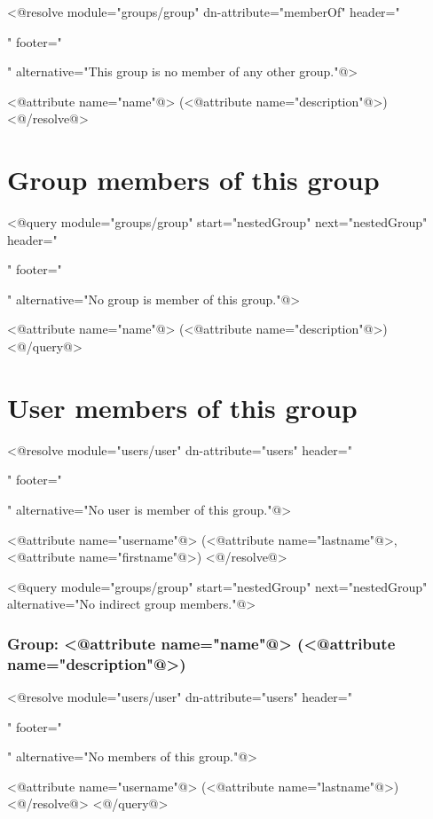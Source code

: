 <@resolve module="groups/group" dn-attribute="memberOf" header="\begin{itemize}" footer="\end{itemize}" alternative="This group is no member of any other group."@>
\item <@attribute name="name"@> (<@attribute name="description"@>)
<@/resolve@>


\section*{Group members of this group}

<@query module="groups/group" start="nestedGroup" next="nestedGroup" header="\begin{itemize}" footer="\end{itemize}" alternative="No group is member of this group."@>
  \item <@attribute name="name"@> (<@attribute name="description"@>)
<@/query@>

\section*{User members of this group}

<@resolve module="users/user" dn-attribute="users" header="\begin{itemize}" footer="\end{itemize}" alternative="No user is member of this group."@>
  \item <@attribute name="username"@> (<@attribute name="lastname"@>, <@attribute name="firstname"@>)
<@/resolve@>

<@query module="groups/group" start="nestedGroup" next="nestedGroup" alternative="No indirect group members."@>
  \subsubsection*{Group: <@attribute name="name"@> (<@attribute name="description"@>)}
  <@resolve module="users/user" dn-attribute="users" header="\begin{itemize}" footer="\end{itemize}" alternative="No members of this group."@>
    \item <@attribute name="username"@> (<@attribute name="lastname"@>)
  <@/resolve@>
<@/query@>

\newpage
